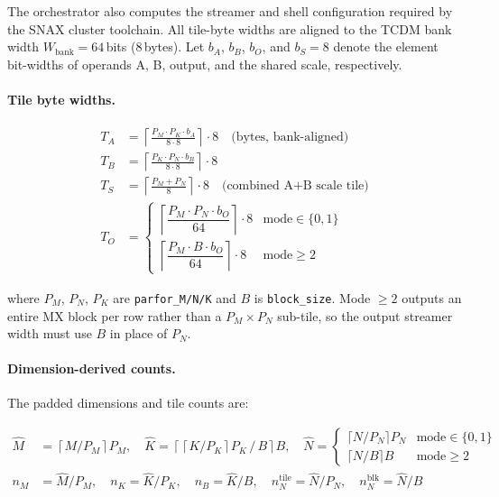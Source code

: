 The orchestrator also computes the streamer and shell configuration
required by the SNAX cluster toolchain.  All tile-byte widths are
aligned to the TCDM bank width $W_{\mathrm{bank}}=64$\,bits (8\,bytes).
Let $b_A$, $b_B$, $b_O$, and $b_S = 8$ denote the element bit-widths
of operands A, B, output, and the shared scale, respectively.

\paragraph{Tile byte widths.}

\begin{align}
T_A &= \left\lceil \frac{P_M \cdot P_K \cdot b_A}{8 \cdot 8} \right\rceil \cdot 8
  \quad \text{(bytes, bank-aligned)} \label{eq:tile_a} \\
T_B &= \left\lceil \frac{P_K \cdot P_N \cdot b_B}{8 \cdot 8} \right\rceil \cdot 8
  \label{eq:tile_b} \\
T_S &= \left\lceil \frac{P_M + P_N}{8} \right\rceil \cdot 8
  \quad \text{(combined A+B scale tile)} \label{eq:tile_s} \\
T_O &=
  \begin{cases}
    \left\lceil \dfrac{P_M \cdot P_N \cdot b_O}{64} \right\rceil \cdot 8
      & \text{mode} \in \{0, 1\} \\[6pt]
    \left\lceil \dfrac{P_M \cdot B \cdot b_O}{64} \right\rceil \cdot 8
      & \text{mode} \geq 2
  \end{cases}
  \label{eq:tile_o}
\end{align}

where $P_M$, $P_N$, $P_K$ are \texttt{parfor\_M/N/K} and $B$ is
\texttt{block\_size}.  Mode $\geq 2$ outputs an entire MX block per
row rather than a $P_M \times P_N$ sub-tile, so the output streamer
width must use $B$ in place of $P_N$.

\paragraph{Dimension-derived counts.}
The padded dimensions and tile counts are:

\begin{align}
\hat{M} &= \left\lceil M / P_M \right\rceil P_M, \quad
\hat{K} = \left\lceil \left\lceil K / P_K \right\rceil P_K \,/\, B \right\rceil B,
\quad
\hat{N} =
\begin{cases}
  \lceil N / P_N \rceil P_N & \text{mode} \in \{0,1\} \\
  \lceil N / B  \rceil B    & \text{mode} \geq 2
\end{cases}
\label{eq:padding}
\\[4pt]
n_M &= \hat{M}/P_M,\quad
n_K = \hat{K}/P_K,\quad
n_B = \hat{K}/B,\quad
n_N^{\mathrm{tile}} = \hat{N}/P_N,\quad
n_N^{\mathrm{blk}} = \hat{N}/B
\label{eq:tile_counts}
\end{align}

